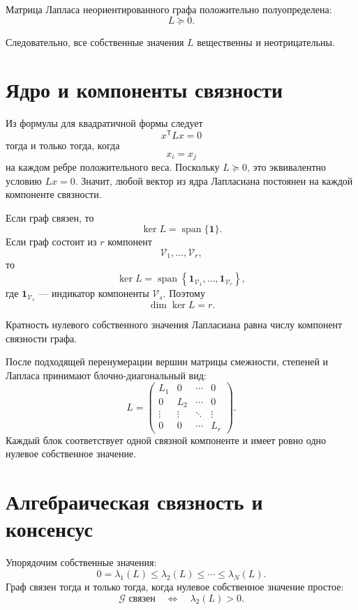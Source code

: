 \begin{theorem}
Матрица Лапласа неориентированного графа положительно
полуопределена:
\[
    L\succeq0.
\]
\end{theorem}

Следовательно, все собственные значения \(L\) вещественны и
неотрицательны.

\section{Ядро и компоненты связности}

Из формулы для квадратичной формы следует
\[
    x^{\mathsf T}Lx=0
\]
тогда и только тогда, когда
\[
    x_i=x_j
\]
на каждом ребре положительного веса. Поскольку \(L\succeq0\), это
эквивалентно условию \(Lx=0\). Значит, любой вектор из ядра
Лапласиана постоянен на каждой компоненте связности.

Если граф связен, то
\[
    \ker L=\operatorname{span}\{\mathbf1\}.
\]
Если граф состоит из \(r\) компонент
\[
    \mathcal V_1,\ldots,\mathcal V_r,
\]
то
\[
    \ker L
    =
    \operatorname{span}
    \left\{
        \mathbf1_{\mathcal V_1},
        \ldots,
        \mathbf1_{\mathcal V_r}
    \right\},
\]
где \(\mathbf1_{\mathcal V_s}\) --- индикатор компоненты
\(\mathcal V_s\). Поэтому
\[
    \dim\ker L=r.
\]

\begin{theorem}
Кратность нулевого собственного значения Лапласиана равна числу
компонент связности графа.
\end{theorem}

После подходящей перенумерации вершин матрицы смежности, степеней и
Лапласа принимают блочно-диагональный вид:
\[
    L=
    \begin{pmatrix}
        L_1&0&\cdots&0\\
        0&L_2&\cdots&0\\
        \vdots&\vdots&\ddots&\vdots\\
        0&0&\cdots&L_r
    \end{pmatrix}.
\]
Каждый блок соответствует одной связной компоненте и имеет ровно одно
нулевое собственное значение.

\section{Алгебраическая связность и консенсус}

Упорядочим собственные значения:
\[
    0=\lambda_1(L)
    \le
    \lambda_2(L)
    \le
    \cdots
    \le
    \lambda_N(L).
\]
Граф связен тогда и только тогда, когда нулевое собственное значение
простое:
\[
    \mathcal G\text{ связен}
    \quad\Longleftrightarrow\quad
    \lambda_2(L)>0.
\]

